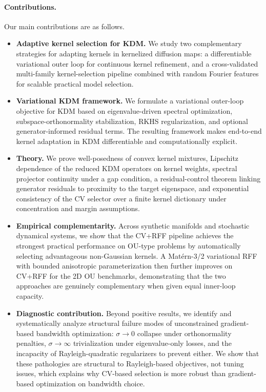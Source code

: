 \documentclass[11pt]{article}
\theoremstyle{remark}
\begin{document}
\paragraph{Contributions.} Our main contributions are as follows.
\begin{itemize}
    \item \textbf{Adaptive kernel selection for KDM.}
    We study two complementary strategies for adapting kernels in kernelized diffusion maps:
    a differentiable variational outer loop for continuous kernel refinement, and a cross-validated
    multi-family kernel-selection pipeline combined with random Fourier features for scalable
    practical model selection.

    \item \textbf{Variational KDM framework.}
    We formulate a variational outer-loop objective for KDM based on eigenvalue-driven spectral
    optimization, subspace-orthonormality stabilization, RKHS regularization, and optional
    generator-informed residual terms. The resulting framework makes end-to-end kernel adaptation
    in KDM differentiable and computationally explicit.

    \item \textbf{Theory.}
    We prove well-posedness of convex kernel mixtures, Lipschitz dependence of the reduced KDM
    operators on kernel weights, spectral projector continuity under a gap condition, a
    residual-control theorem linking generator residuals to proximity to the target eigenspace,
    and exponential consistency of the CV selector over a finite kernel dictionary
    under concentration and margin assumptions.

    \item \textbf{Empirical complementarity.}
    Across synthetic manifolds and stochastic dynamical systems, we show that the CV+RFF pipeline
    achieves the strongest practical performance on OU-type problems by automatically selecting
    advantageous non-Gaussian kernels. A Mat\'ern-3/2 variational RFF with bounded anisotropic
    parameterization then further improves on CV+RFF for the 2D OU benchmarks, demonstrating that
    the two approaches are genuinely complementary when given equal inner-loop capacity.

    \item \textbf{Diagnostic contribution.}
    Beyond positive results, we identify and systematically analyze structural failure modes of
    unconstrained gradient-based bandwidth optimization: $\sigma\to 0$ collapse under
    orthonormality penalties, $\sigma\to\infty$ trivialization under eigenvalue-only losses,
    and the incapacity of Rayleigh-quadratic regularizers to prevent either. We show that these
    pathologies are structural to Rayleigh-based objectives, not tuning issues, which explains
    why CV-based selection is more robust than gradient-based optimization on bandwidth choice.
\end{itemize}
\end{document}
